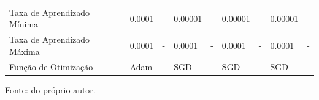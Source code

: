 \begin{table}[H]
{\begin{tabular}{l|l|l|l|l|l|l|l|l}
            Taxa de Aprendizado Mínima                   & 0.0001                             & -                       & 0.00001                            & -                       & 0.00001                            & -                       & 0.00001                            & -                                                                  \\
            Taxa de Aprendizado Máxima                   & 0.0001                             & -                       & 0.0001                             & -                       & 0.0001                             & -                       & 0.0001                             & -                                                                  \\
            Função de Otimização                         & Adam                               & -                       & SGD                                & -                       & SGD                                & -                       & SGD                                & -                       
        \end{tabular}
        }

    \vspace*{1 cm}
    Fonte: do próprio autor.
\end{table}


